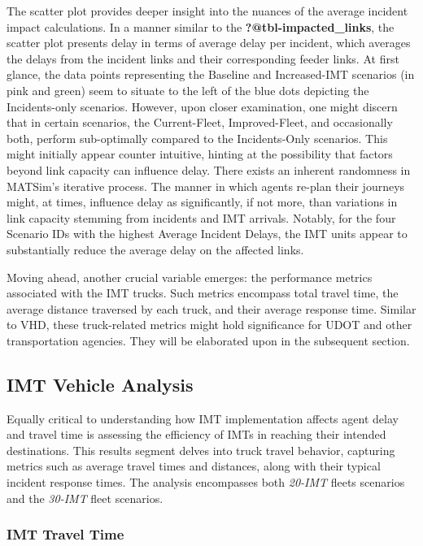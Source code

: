\documentclass[
  letterpaper,
  authoryear]{elsarticle}
\begin{document}
The scatter plot provides deeper insight into the nuances of the average
incident impact calculations. In a manner similar to the
\textbf{?@tbl-impacted\_links}, the scatter plot presents delay in terms
of average delay per incident, which averages the delays from the
incident links and their corresponding feeder links. At first glance,
the data points representing the Baseline and Increased-IMT scenarios
(in pink and green) seem to situate to the left of the blue dots
depicting the Incidents-only scenarios. However, upon closer
examination, one might discern that in certain scenarios, the
Current-Fleet, Improved-Fleet, and occasionally both, perform
sub-optimally compared to the Incidents-Only scenarios. This might
initially appear counter intuitive, hinting at the possibility that
factors beyond link capacity can influence delay. There exists an
inherent randomness in MATSim's iterative process. The manner in which
agents re-plan their journeys might, at times, influence delay as
significantly, if not more, than variations in link capacity stemming
from incidents and IMT arrivals. Notably, for the four Scenario IDs with
the highest Average Incident Delays, the IMT units appear to
substantially reduce the average delay on the affected links.

Moving ahead, another crucial variable emerges: the performance metrics
associated with the IMT trucks. Such metrics encompass total travel
time, the average distance traversed by each truck, and their average
response time. Similar to VHD, these truck-related metrics might hold
significance for UDOT and other transportation agencies. They will be
elaborated upon in the subsequent section.

\hypertarget{imt-vehicle-analysis}{%
\subsection{IMT Vehicle Analysis}\label{imt-vehicle-analysis}}

Equally critical to understanding how IMT implementation affects agent
delay and travel time is assessing the efficiency of IMTs in reaching
their intended destinations. This results segment delves into truck
travel behavior, capturing metrics such as average travel times and
distances, along with their typical incident response times. The
analysis encompasses both \emph{20-IMT} fleets scenarios and the
\emph{30-IMT} fleet scenarios.

\hypertarget{imt-travel-time}{%
\subsubsection{IMT Travel Time}\label{imt-travel-time}}
\end{document}
